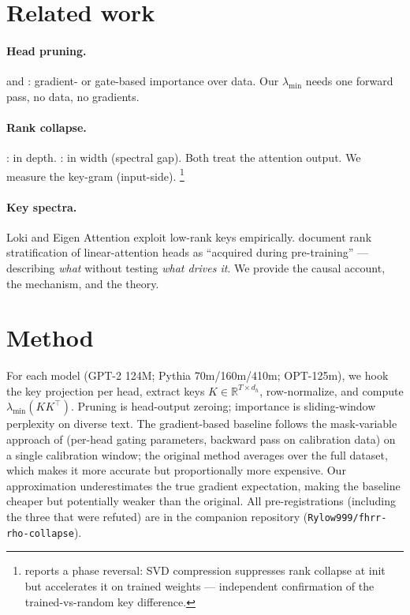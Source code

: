 \documentclass[11pt]{article}
\begin{document}
\section{Related work}

\paragraph{Head pruning.} \citet{michel2019sixteen} and
\citet{voita2019analyzing}: gradient- or gate-based importance over data.
Our $\lambda_{\min}$ needs one forward pass, no data, no gradients.

\paragraph{Rank collapse.} \citet{dong2021attention}: in depth.
\citet{naitsaada2025mind}: in width (spectral gap). Both treat the
attention output. We measure the key-gram (input-side).%
\footnote{\citet{kalvakolanu2026phase} reports a phase reversal: SVD
compression suppresses rank collapse at init but accelerates it on
trained weights --- independent confirmation of the trained-vs-random
key difference.}

\paragraph{Key spectra.} Loki \citep{loki2024} and Eigen Attention
\citep{eigenattn2024} exploit low-rank keys empirically.
\citet{staterank2026} document rank stratification of linear-attention
heads as ``acquired during pre-training'' --- describing \emph{what}
without testing \emph{what drives it}. We provide the causal account,
the mechanism, and the theory.

\section{Method}

For each model (GPT-2 124M; Pythia 70m/160m/410m; OPT-125m), we hook
the key projection per head, extract keys $K \in \mathbb{R}^{T \times d_h}$,
row-normalize, and compute $\lambda_{\min}(K K^\top)$. Pruning is
head-output zeroing; importance is sliding-window perplexity on diverse
text. The gradient-based baseline follows the mask-variable approach
of \citet{michel2019sixteen} (per-head gating parameters, backward
pass on calibration data) on a single calibration window; the
original method averages over the full dataset, which makes it more
accurate but proportionally more expensive. Our approximation
underestimates the true gradient expectation, making the baseline
cheaper but potentially weaker than the original. All
pre-registrations (including the three that were refuted) are in the
companion repository (\texttt{Rylow999/fhrr-rho-collapse}).
\end{document}
